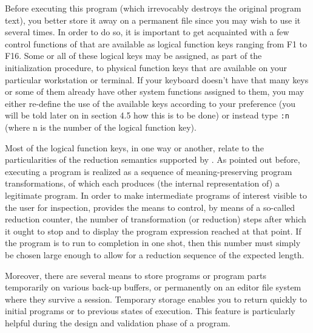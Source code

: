 Before executing this program (which irrevocably destroys the original program text),
 you better store it away on a permanent file since you may wish to use it several times.
In order to do so, it is important to get acquainted with
a few {\mys control functions} of \pired that are available
as {\mys logical function keys}
ranging from F1 to F16. Some or all of these logical keys may be 
assigned, as part of the \pired initialization procedure,
 to {\mys physical function keys} that are available on
your particular workstation or terminal. If your keyboard doesn't
 have that many keys
or some of them already have other system functions assigned to them,
you may either re-define the use of the available keys according to your
preference (you will be told later on in section 4.5 
how this is to be done) or instead type
{\tt :n} (where n is the number of the logical function key).

Most of the logical function keys, in one way or another, relate to the particularities
 of the reduction semantics supported by \pired. As pointed out before,
executing a program is realized as a sequence of meaning-preserving
 program transformations,
of which each produces (the internal representation of) 
a legitimate \kir program. In order to make intermediate programs
of interest visible to the user for inspection,
\pired provides the means to control, by means of a so-called {\mys reduction counter},
the number of transformation (or reduction) steps after which it ought to stop
 and to display the program expression reached at that point. If the program
is to run to completion in one shot, then this number must simply be chosen
 large enough to allow for a reduction sequence of the expected length. 

Moreover, there are several means to {\mys store programs} or program parts 
temporarily
on various {\mys back-up buffers}, or permanently on an {\mys editor file system}
where they survive a \pired session. Temporary storage
enables you to return quickly to initial programs or to previous states of
execution. This feature is particularly helpful during the design and validation phase of a program.

